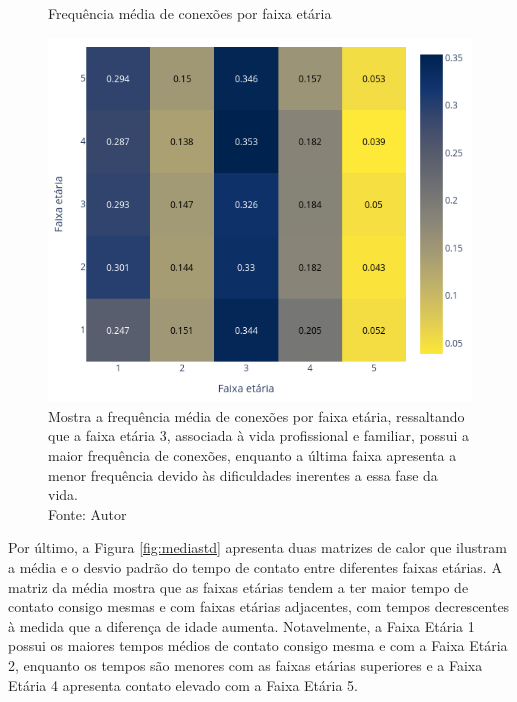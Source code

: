 \begin{figure}[H]
    \centering
    \captionsetup{font=normalsize,skip=0.8pt,singlelinecheck=on,labelsep=endash}
    \caption{Frequência média de conexões por faixa etária}
    \includegraphics[scale= 0.5]{figuras/h-PIF.png}
    \captionsetup{font=small,justification=justified}
    \caption*{Mostra a frequência média de conexões por faixa etária, ressaltando que a faixa etária 3, associada à vida profissional e familiar, possui a maior frequência de conexões, enquanto a última faixa apresenta a menor frequência devido às dificuldades inerentes a essa fase da vida. \\Fonte: Autor}
    \label{fig:heat}
\end{figure}

Por último, a Figura \ref{fig:mediastd} apresenta duas matrizes de calor que ilustram a média e o desvio padrão do tempo de contato entre diferentes faixas etárias. A matriz da média mostra que as faixas etárias tendem a ter maior tempo de contato consigo mesmas e com faixas etárias adjacentes, com tempos decrescentes à medida que a diferença de idade aumenta. Notavelmente, a Faixa Etária 1 possui os maiores tempos médios de contato consigo mesma e com a Faixa Etária 2, enquanto os tempos são menores com as faixas etárias superiores e a Faixa Etária 4 apresenta contato elevado com a Faixa Etária 5.

